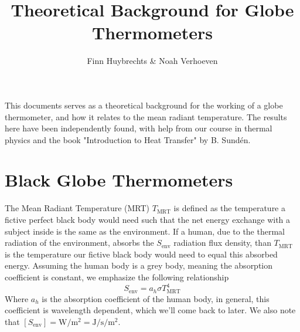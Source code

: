 \documentclass[]{scrartcl}
\title{Theoretical Background for Globe Thermometers}
\author{Finn Huybrechts \& Noah Verhoeven}
\begin{document}
\maketitle

This documents serves as a theoretical background for the working of a globe thermometer, and how it relates to the mean radiant temperature. The results here have been independently found, with help from our course in thermal physics and the book "Introduction to Heat Transfer" by B. Sundén.

\section{Black Globe Thermometers}
The Mean Radiant Temperature (MRT) $T_{\text{MRT}}$ is defined as the temperature a fictive perfect black body would need such that the net energy exchange with a subject inside is the same as the environment. If a human, due to the thermal radiation of the environment, absorbs the $S_{\text{env}}$ radiation flux density, than $T_{\text{MRT}}$ is the temperature our fictive black body would need to equal this absorbed energy. Assuming the human body is a grey body, meaning the absorption coefficient is constant, we emphasize the following relationship
\begin{equation}\label{eq:emphasis}
	S_{\text{env}} = a_{h}\sigma T^4_{\text{MRT}}
\end{equation}
Where $a_{h}$ is the absorption coefficient of the human body, in general, this coefficient is wavelength dependent, which we'll come back to later. We also note that $\left[S_{\text{env}}\right] = \unit{\watt\per\meter\squared} = \unit{\joule\per\second\per\meter\squared}$.
\end{document}

